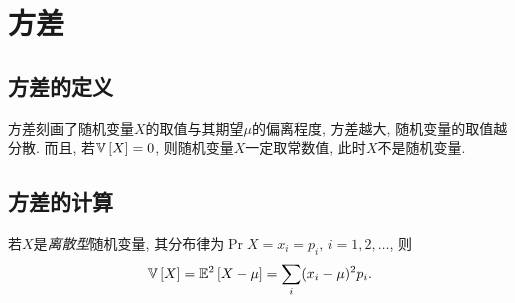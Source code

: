 \section{方差}
\subsection{方差的定义}
方差刻画了随机变量$X$的取值与其期望$\mu$的偏离程度, 方差越大, 随机变量的取值越分散. 而且, 若$\Var{X} = 0$, 则随机变量$X$一定取常数值, 此时$X$不是随机变量.
\subsection{方差的计算}
若$X$是\emph{离散型}随机变量, 其分布律为$\Pr{X=x_i} = p_i, \, i=1, 2, \ldots$, 则
\begin{equation}
    \Var{X} = \EE[2]{X-\mu} = \sum_{i}(x_i-\mu)^2p_i.
\end{equation}

